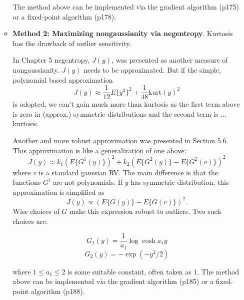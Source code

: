 \documentclass[a4paper]{book}
\begin{document}
\begin{itemize}
\begin{itemize}
The method above can be implemented via the gradient algorithm (p175) or a fixed-point algorithm (p178).

\item \textbf{Method 2: Maximizing nongaussianity via negentropy}. Kurtosis has the drawback of outlier sensitivity.

In Chapter 5 negentropy, $J(y)$,  was presented as another measure of nongaussianity. $J(y)$ needs to be approximated. But if the simple, polynomial based approximation 
$$J(y)\approx \frac{1}{12}E\{y^3\}^2+\frac{1}{48}\text{kurt}(y)^2$$
is adopted, we can't gain much more than kurtosis as the first term above is zero in (approx.) symmetric distributions and the second term is ... kurtosis. 

Another and more robust approximation was presented in Section 5.6. This approximation is like a generalization of one above:
$$J(y)\approx k_1(E\{G^1(y)\})^2 + k_2(E\{G^2(y)\}-E\{G^2(v)\})^2$$
where $v$ is a standard gaussian RV.
The main difference is that the functions $G^i$ are not polynomials. If $y$ has symmetric distribution, this approximation is simplified as 
$$J(y) \propto (E\{G(y)\}-E\{G(v)\})^2.$$
Wise choices of $G$ make this expression robust to outliers. Two such choices are:

$$G_1(y) = \frac{1}{a_1}\log\cosh a_1 y$$
$$G_2(y) = -\exp (-y^2/2)$$

where $1\le a_1 \le 2$ is some suitable constant, often taken as 1.
The method above can be implemented via the gradient algorithm (p185) or a fixed-point algorithm (p188).
\end{itemize}


\end{itemize}
\end{document}
